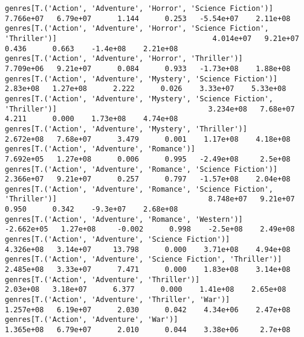 \documentclass[11pt]{article}
\begin{document}
\begin{Verbatim}[commandchars=\\\{\}]
genres[T.('Action', 'Adventure', 'Horror', 'Science Fiction')]                                                7.766e+07   6.79e+07      1.144      0.253   -5.54e+07    2.11e+08
genres[T.('Action', 'Adventure', 'Horror', 'Science Fiction', 'Thriller')]                                    4.014e+07   9.21e+07      0.436      0.663    -1.4e+08    2.21e+08
genres[T.('Action', 'Adventure', 'Horror', 'Thriller')]                                                       7.709e+06   9.21e+07      0.084      0.933   -1.73e+08    1.88e+08
genres[T.('Action', 'Adventure', 'Mystery', 'Science Fiction')]                                                2.83e+08   1.27e+08      2.222      0.026    3.33e+07    5.33e+08
genres[T.('Action', 'Adventure', 'Mystery', 'Science Fiction', 'Thriller')]                                   3.234e+08   7.68e+07      4.211      0.000    1.73e+08    4.74e+08
genres[T.('Action', 'Adventure', 'Mystery', 'Thriller')]                                                      2.672e+08   7.68e+07      3.479      0.001    1.17e+08    4.18e+08
genres[T.('Action', 'Adventure', 'Romance')]                                                                  7.692e+05   1.27e+08      0.006      0.995   -2.49e+08     2.5e+08
genres[T.('Action', 'Adventure', 'Romance', 'Science Fiction')]                                               2.366e+07   9.21e+07      0.257      0.797   -1.57e+08    2.04e+08
genres[T.('Action', 'Adventure', 'Romance', 'Science Fiction', 'Thriller')]                                   8.748e+07   9.21e+07      0.950      0.342    -9.3e+07    2.68e+08
genres[T.('Action', 'Adventure', 'Romance', 'Western')]                                                      -2.662e+05   1.27e+08     -0.002      0.998    -2.5e+08    2.49e+08
genres[T.('Action', 'Adventure', 'Science Fiction')]                                                          4.326e+08   3.14e+07     13.798      0.000    3.71e+08    4.94e+08
genres[T.('Action', 'Adventure', 'Science Fiction', 'Thriller')]                                              2.485e+08   3.33e+07      7.471      0.000    1.83e+08    3.14e+08
genres[T.('Action', 'Adventure', 'Thriller')]                                                                  2.03e+08   3.18e+07      6.377      0.000    1.41e+08    2.65e+08
genres[T.('Action', 'Adventure', 'Thriller', 'War')]                                                          1.257e+08   6.19e+07      2.030      0.042    4.34e+06    2.47e+08
genres[T.('Action', 'Adventure', 'War')]                                                                      1.365e+08   6.79e+07      2.010      0.044    3.38e+06     2.7e+08

\end{Verbatim}
\end{document}
